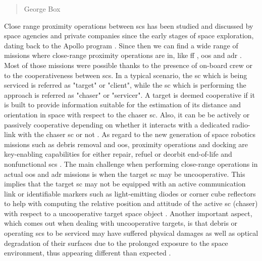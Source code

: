 \begin{quotation}
  {\footnotesize
    \begin{flushright}
      George Box
    \end{flushright}
  }
\end{quotation}
\vspace{0.5cm}

Close range proximity operations between \acrfull{sc}s has been studied and discussed by space agencies and private companies since the early stages of space exploration, dating back to the Apollo program \cite{LangleyApollo}.
Since then we can find a wide range of missions where close-range proximity operations are in, like \acrfull{ff} \cite{2001FormationFliying}  \cite{2009FormationFliying}, \acrfull{oos} \cite{auricchio} \cite{Zimpfer2005} \cite{Tatsch2006} \cite{FloresAbad2014} and \acrfull{adr} \cite{clerc2012astrium} \cite{Bonnal2013}.
Most of those missions were possible thanks to the presence of on-board crew or to the cooperativeness between \acrshort{sc}s.
In a typical scenario, the \acrshort{sc} which is being serviced is referred as "target" or "client", while the \acrshort{sc} which is performing the approach is referred as "chaser" or "servicer". A target is deemed cooperative if it is built to provide information suitable for the estimation of its distance and orientation in space with respect to the chaser \acrshort{sc}. Also, it can be be actively or passively cooperative depending on whether it interacts with a dedicated radio-link with the chaser \acrshort{sc} or not \cite{Opromolla2017}.
As regard to the new generation of space robotics missions such as debris removal and \acrshort{oos}, proximity operations and docking are key-enabling capabilities for either repair, refuel or deorbit end-of-life and nonfunctional \acrshort{sc}s \cite{2016Ventura}.
The main challenge when performing close-range operations in actual \acrshort{oos} and \acrshort{adr} missions is when the target \acrshort{sc} may be uncooperative.
This implies that the target \acrshort{sc} may not be equipped with an active communication link or identifiable markers such as light-emitting diodes or corner cube reflectors to help with computing the relative position and attitude of the active \acrshort{sc} (chaser) with respect to a uncooperative target space object \cite{2019phdSharma}.
Another important aspect, which comes out when dealing with uncooperative targets, is that debris or operating \acrshort{sc}s to be serviced may have suffered physical damages as well as optical degradation of their surfaces due to the prolonged exposure to the space environment, thus appearing different than expected \cite{Opromolla2017}.

